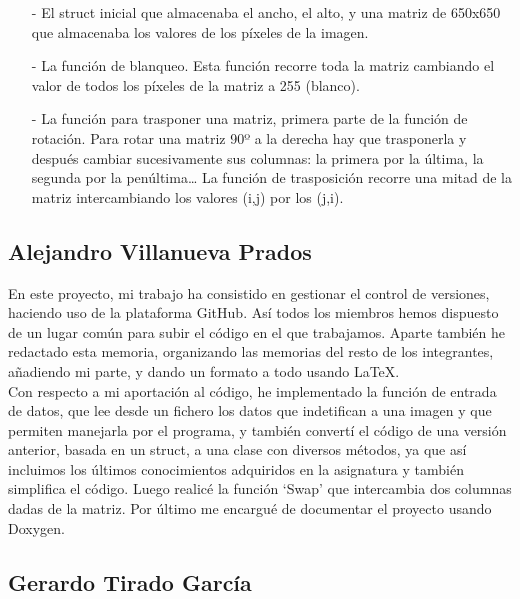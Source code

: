 \documentclass[a4paper, 11pt, spanish]{article}
\begin{document}
\begin{itemize}

\item[-] El struct inicial que almacenaba el ancho, el alto, y una matriz de 650x650 que almacenaba los valores de los píxeles de la imagen.

\item[-] La función de blanqueo. Esta función recorre toda la matriz cambiando el valor de todos los píxeles de la matriz a 255 (blanco).

\item[-] La función para trasponer una matriz, primera parte de la función de rotación. Para rotar una matriz 90º a la derecha hay que trasponerla y después cambiar sucesivamente sus columnas: la primera por la última, la segunda por la penúltima… La función de trasposición recorre una mitad de la matriz intercambiando los valores (i,j) por los (j,i).

\end{itemize}


\subsection{Alejandro Villanueva Prados}

En este proyecto, mi trabajo ha consistido en gestionar el control de versiones, haciendo uso de la plataforma GitHub. Así todos los miembros hemos dispuesto de un lugar común para subir el código en el que trabajamos. Aparte también he redactado esta memoria, organizando las memorias del resto de los integrantes, añadiendo mi parte, y dando un formato a todo usando \LaTeX.
\\

Con respecto a mi aportación al código, he implementado la función de entrada de datos, que lee desde un fichero los datos que indetifican a una imagen y que permiten manejarla por el programa, y también convertí el código de una versión anterior, basada en un struct, a una clase con diversos métodos, ya que así incluimos los últimos conocimientos adquiridos en la asignatura y también simplifica el código. Luego realicé la función `Swap' que intercambia dos columnas dadas de la matriz. Por último me encargué de documentar el proyecto usando Doxygen.


\subsection{Gerardo Tirado García}
\end{document}
